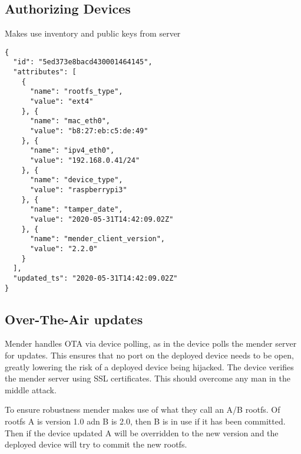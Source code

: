 \documentclass[../../main.tex]{subfiles}
\begin{document}
\subsection{Authorizing Devices}%
\label{sub:authorizing_devices}

Makes use inventory and public keys from server

\begin{verbatim}
{
  "id": "5ed373e8bacd430001464145",
  "attributes": [
    {
      "name": "rootfs_type",
      "value": "ext4"
    }, {
      "name": "mac_eth0",
      "value": "b8:27:eb:c5:de:49"
    }, {
      "name": "ipv4_eth0",
      "value": "192.168.0.41/24"
    }, {
      "name": "device_type",
      "value": "raspberrypi3"
    }, {
      "name": "tamper_date",
      "value": "2020-05-31T14:42:09.02Z"
    }, {
      "name": "mender_client_version",
      "value": "2.2.0"
    }
  ],
  "updated_ts": "2020-05-31T14:42:09.02Z"
}

\end{verbatim}




\subsection{Over-The-Air updates}%
\label{sub:over_the_air_updates}

Mender handles OTA via device polling, as in the device polls the mender server for updates.
This ensures that no port on the deployed device needs to be open, greatly lowering the risk of
a deployed device being hijacked.
The device verifies the mender server using SSL certificates.
This should overcome any man in the middle attack.

To ensure robustness mender makes use of what they call an A/B rootfs.
Of rootfs A is version 1.0 adn B is 2.0, then B is in use if it has been committed.
Then if the device updated A will be overridden to the new version and the deployed device will
try to commit the new rootfs.





%
%
%
%
	
\end{document}
